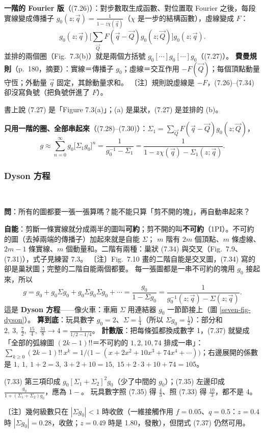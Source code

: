 \textbf{一階的 Fourier 版}（(7.26)）：對步數取生成函數、對位置取 Fourier 之後，每段實線變成傳播子 $g_0(z;\vec q)=\frac1{1-z\chi(\vec q)}$（$\chi$ 是一步的結構函數），虛線變成 $F$：
\[g_0(z;\vec q)\Big[\sum_{\vec Q}F(\vec q-\vec Q)g_0(z;\vec Q)\Big]g_0(z;\vec q).\tag{7.26}\]
並排的兩個圈（Fig.~7.3(b)）就是兩個方括號 $g_0[\cdots]g_0[\cdots]g_0$（(7.27)）。
\textbf{費曼規則}（p.~180，摘要）：實線＝傳播子 $g_0$；虛線＝交互作用 $-F(\vec Q)$；每個頂點動量守恆；外動量 $\vec q$ 固定，其餘動量求和。
〔注〕規則說虛線是 $-F$，(7.26)--(7.34) 卻沒寫負號（把負號併進了 $F$）。
\begin{errbox}[p.~178，(7.27) 前]
書上說 (7.27) 是「Figure 7.3(a)」；(a) 是巢狀，(7.27) 是並排的 (b)。
\end{errbox}
\textbf{只用一階的圈、全部串起來}（(7.28)--(7.30)）：$\Sigma_1=\sum_{\vec Q}F(\vec q-\vec Q)g_0(z;\vec Q)$，
\[g\approx\sum_{n=0}^\infty g_0\big[\Sigma_1g_0\big]^n=\frac{1}{g_0^{-1}-\Sigma_1}=\frac1{1-z\chi(\vec q)-\Sigma_1(z;\vec q)}.\tag{7.30}\]

\subsubsection{Dyson 方程}
\leavevmode{}\ \par\nopagebreak

\textbf{問}：所有的圖都要一張一張算嗎？能不能只算「剪不開的塊」，再自動串起來？

\textbf{自能}：剪斷一條實線就分成兩半的圖叫\textbf{可約}；剪不開的叫\textbf{不可約}（1PI）。不可約的圖（去掉兩端的傳播子）加起來就是自能 $\Sigma$；
$m$ 階有 $2m$ 個頂點、$m$ 條虛線、$2m-1$ 條實線、$m$ 個動量和。二階有兩種：巢狀 (7.34) 與交叉（Fig.~7.9、(7.31)），式子見練習 7.3。
〔注〕Fig.~7.10 畫的二階自能是交叉圖，(7.34) 寫的卻是巢狀圖；完整的二階自能兩個都要。
每一張圖都是一串不可約的塊用 $g_0$ 接起來，所以
\[g=g_0+g_0\Sigma g_0+g_0\Sigma g_0\Sigma g_0+\cdots=\frac{g_0}{1-\Sigma g_0}=\frac{1}{g_0^{-1}(z;\vec q)-\Sigma(z;\vec q)}.\tag{7.36, 7.37}\]
這是 \textbf{Dyson 方程}——像火車：車廂 $\Sigma$ 用連結器 $g_0$ 一節節接上（圖 \ref{seven-fig-dyson}）。
\textbf{算到底}：玩具數字 $g_0=2$、$\Sigma=\frac14$（所以 $\Sigma g_0=\frac12$）：部分和 $2,\ 3,\ \frac72,\ \frac{15}4,\ \frac{31}8\to4=\frac1{1/2-1/4}$。
\textbf{計數版}：把每條弧都換成數字 1，(7.37) 就變成「全部的弧線圖 $(2k-1)!!$＝不可約的 $1,2,10,74$ 排成一串」：
$\sum_{k\ge0}(2k-1)!!\,x^k=1/\big(1-(x+2x^2+10x^3+74x^4+\cdots)\big)$；右邊展開的係數是 $1,\ 1,\ 1+2=3,\ 3+2+10=15,\ 15+2\cdot3+10+74=105$。
\begin{errbox}[p.~183，(7.33)(7.35)]
(7.33) 第三項印成 $g_0[\Sigma_1+\Sigma_2]^2g_0$（少了中間的 $g_0$）；(7.35) 左邊印成 $\frac{g_0}{1+(\Sigma_1+\Sigma_2)g_0}$，應為 $1-$。
玩具數字照 (7.35) 得 $\frac43$、照 (7.33) 得 $\frac{10}3$，都不是 4。
\end{errbox}
〔注〕幾何級數只在 $|\Sigma g_0|<1$ 時收斂（一維接觸作用 $f=0.05$、$q=0.5$：$z=0.4$ 時 $|\Sigma g_0|=0.28$，收斂；$z=0.49$ 時是 1.80，發散），但閉式 (7.37) 仍然可用。

